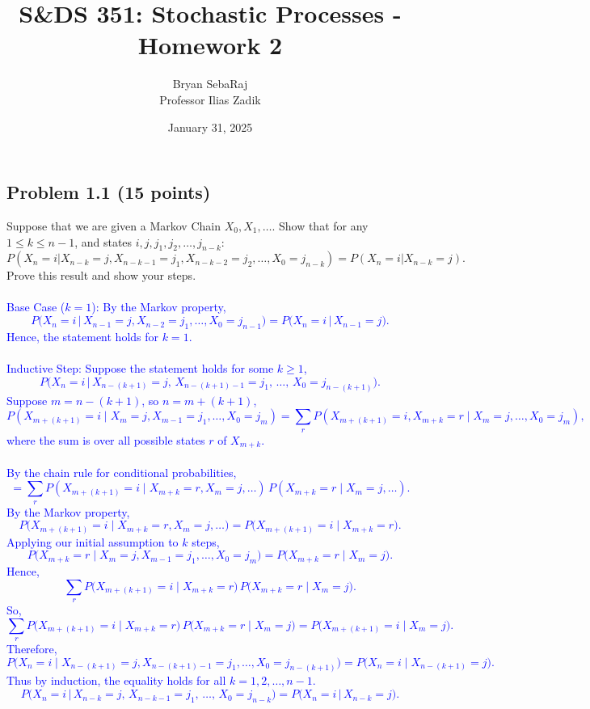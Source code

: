 \documentclass{article}
\title{S\&DS 351: Stochastic Processes - Homework 2}
\author{Bryan SebaRaj \\[0.8em] Professor Ilias Zadik}
\date{January 31, 2025}
\begin{document}
\maketitle

\subsection*{Problem 1.1 (15 points)}
Suppose that we are given a Markov Chain $X_0, X_1, \ldots$. Show that for any $1 \leq k \leq n-1$, and states $i, j, j_1, j_2, \ldots, j_{n-k}$:
\[
P(X_n = i | X_{n-k} = j, X_{n-k-1} = j_1, X_{n-k-2} = j_2, \ldots, X_0 = j_{n-k}) = P(X_n = i | X_{n-k} = j).
\]
Prove this result and show your steps. \\  \\ 
\textcolor{blue}{
Base Case ($k = 1$): By the Markov property,
\[
P\bigl(X_{n} = i \,\big\vert\, X_{n-1} = j, X_{n-2} = j_1, \ldots, X_0 = j_{n-1}\bigr)
=
P\bigl(X_{n} = i \,\big\vert\, X_{n-1} = j\bigr).
\]
Hence, the statement holds for $k=1$. \\  \\ 
Inductive Step: Suppose the statement holds for some $k \ge 1$,
\[
P\bigl(X_n = i \,\big\vert\, X_{n-(k+1)} = j,\, X_{n-(k+1)-1} = j_1,\, \ldots,\, X_0 = j_{n-(k+1)}\bigr).
\]
Suppose $m = n - (k+1)$, so $n = m + (k+1)$,
\[
P(X_{m + (k+1)} = i \mid X_m = j, X_{m-1} = j_1, \ldots, X_0 = j_m)
=
\sum_{r}
P(X_{m + (k+1)} = i, X_{m+k} = r \mid X_m = j, \ldots, X_0 = j_m),
\]
where the sum is over all possible states $r$ of $X_{m+k}$. \\ \\ By the chain rule for conditional probabilities,
\[
= \sum_{r}
P(X_{m + (k+1)} = i \mid X_{m+k} = r, X_m = j, \ldots)
\,
P(X_{m+k} = r \mid X_m = j, \ldots).
\]
By the Markov property,
\[
P\bigl(X_{m + (k+1)} = i \mid X_{m+k} = r, X_m = j, \ldots\bigr)
=
P\bigl(X_{m + (k+1)} = i \mid X_{m+k} = r\bigr).
\]
Applying our initial assumption to $k$ steps,
\[
P\bigl(X_{m+k} = r \mid X_m = j, X_{m-1} = j_1, \ldots, X_0 = j_m\bigr)
=
P\bigl(X_{m+k} = r \mid X_m = j\bigr).
\]
Hence,
\[
\sum_{r}
P\bigl(X_{m + (k+1)} = i \mid X_{m+k} = r\bigr)\,
P\bigl(X_{m+k} = r \mid X_m = j\bigr).
\]
So,
\[
\sum_{r}
P\bigl(X_{m + (k+1)} = i \mid X_{m+k} = r\bigr)\,
P\bigl(X_{m+k} = r \mid X_m = j\bigr)
=
P\bigl(X_{m + (k+1)} = i \mid X_m = j\bigr).
\]
Therefore,
\[
P\bigl(X_n = i \mid X_{n-(k+1)} = j, X_{n-(k+1)-1} = j_1, \ldots, X_0 = j_{n-(k+1)}\bigr)
=
P\bigl(X_n = i \mid X_{n-(k+1)} = j\bigr).
\]
Thus by induction, the equality holds for all $k = 1, 2, \ldots, n-1$. 
\[
P\bigl(X_n = i \,\big\vert\, X_{n-k} = j,\, X_{n-k-1} = j_1,\, \ldots,\, X_0 = j_{n-k}\bigr)
=
P\bigl(X_n = i \,\big\vert\, X_{n-k} = j\bigr).
\]
}
\end{document}
